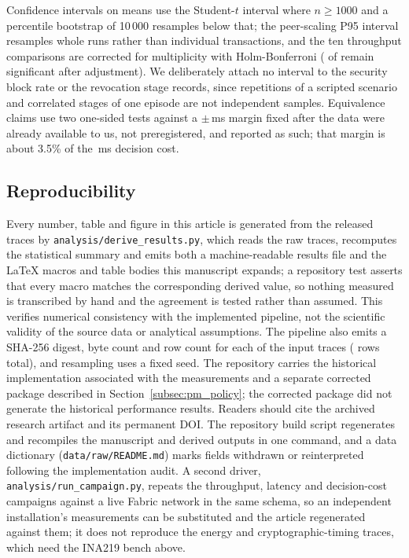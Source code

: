 \documentclass[a4paper,fleqn]{cas-dc}
\begin{document}
Confidence intervals on means use the Student-$t$ interval where
$n \ge 1000$ and a percentile bootstrap of 10\,000 resamples below that;
the peer-scaling P95 interval resamples whole runs rather than individual
transactions, and the ten throughput comparisons are corrected for
multiplicity with Holm-Bonferroni (\OverheadHolmSig{} of \OverheadLevels{}
remain significant after adjustment). We deliberately attach no interval
to the security block rate or the revocation stage records, since
repetitions of a scripted scenario and correlated stages of one episode
are not independent samples. Equivalence claims use two one-sided tests
against a $\pm$\DecisionMargin\,ms margin fixed after the data were
already available to us, not preregistered, and reported as such; that
margin is about 3.5\% of the \DecisionMean\,ms decision cost.

\subsection{Reproducibility}
\label{subsec:repro}

Every number, table and figure in this article is generated from the
released traces by \texttt{analysis/derive\_results.py}, which reads the
raw traces, recomputes the statistical summary and emits both a
machine-readable results file and the LaTeX macros and table bodies this
manuscript expands; a repository test asserts that every macro matches the
corresponding derived value, so nothing measured is transcribed by hand
and the agreement is tested rather than assumed. This verifies numerical consistency with the implemented pipeline, not the scientific validity of the source data or analytical assumptions. The pipeline also emits
a SHA-256 digest, byte count and row count for each of the \TraceCount{}
input traces (\TraceRows{} rows total), and resampling uses a fixed seed.
The repository carries the historical implementation associated with the
measurements and a separate corrected package described in
Section~\ref{subsec:pm_policy}; the corrected package did not generate the
historical performance results. Readers should cite the archived research artifact and its permanent DOI. The repository build script regenerates and recompiles the manuscript and derived outputs in one command, and a data dictionary (\texttt{data/raw/README.md}) marks fields
withdrawn or reinterpreted following the implementation audit. A second driver,
\texttt{analysis/run\_campaign.py}, repeats the throughput, latency and
decision-cost campaigns against a live Fabric network in the same schema,
so an independent installation's measurements can be substituted and the
article regenerated against them; it does not reproduce the energy and
cryptographic-timing traces, which need the INA219 bench above.
\end{document}
